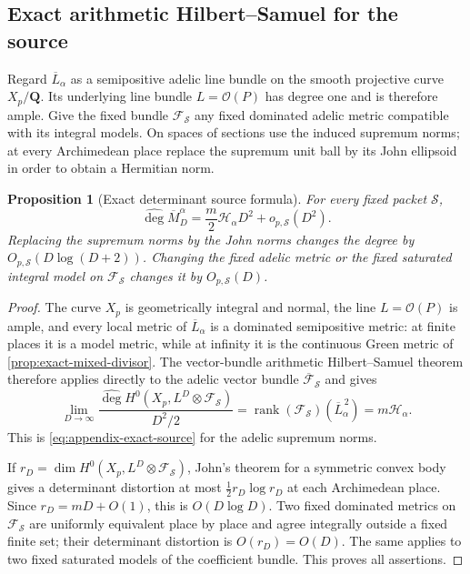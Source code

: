 \documentclass[11pt]{article}
\newtheorem{proposition}[proposition]{Proposition}
\theoremstyle{definition}
\theoremstyle{remark}
\newcommand{\Q}{\mathbf Q}
\newcommand{\rank}{\operatorname{rank}}
\newcommand{\calF}{\mathcal F}
\newcommand{\widehatdeg}{\widehat{\deg}}
\newcommand{\Energy}{\mathscr H}
\begin{document}
\subsection{Exact arithmetic Hilbert--Samuel for the source}

Regard $\overline L_\alpha$ as a semipositive adelic line bundle on the
smooth projective curve $X_p/\Q$.  Its underlying line bundle
$L=\mathcal O(P)$ has degree one and is therefore ample.  Give the fixed
bundle $\calF_{\mathcal S}$ any fixed dominated adelic metric compatible with
its integral models.  On spaces of sections use the induced supremum norms;
at every Archimedean place replace the supremum unit ball by its John
ellipsoid in order to obtain a Hermitian norm.

\begin{proposition}[Exact determinant source formula]
\label{prop:exact-source-formula}
For every fixed packet $\mathcal S$,
\begin{equation}\label{eq:appendix-exact-source}
 \widehatdeg\overline M_D^\alpha
 =\frac m2\Energy_\alpha D^2+o_{p,\mathcal S}(D^2).
\end{equation}
Replacing the supremum norms by the John norms changes the degree by
$O_{p,\mathcal S}(D\log(D+2))$.  Changing the fixed adelic metric or the fixed
saturated integral model on $\calF_{\mathcal S}$ changes it by
$O_{p,\mathcal S}(D)$.
\end{proposition}

\begin{proof}
The curve $X_p$ is geometrically integral and normal, the line
$L=\mathcal O(P)$ is ample, and every local metric of
$\overline L_\alpha$ is a dominated semipositive metric: at finite places
it is a model metric, while at infinity it is the continuous Green metric of
\cref{prop:exact-mixed-divisor}.  The vector-bundle arithmetic
Hilbert--Samuel theorem
\cite[Corollary~4.5.2]{ChenMoriwaki2024} therefore applies directly to the
adelic vector bundle $\overline{\calF}_{\mathcal S}$ and gives
\[
 \lim_{D\to\infty}
 \frac{\widehatdeg H^0(X_p,L^D\otimes\calF_{\mathcal S})}{D^2/2}
 =\rank(\calF_{\mathcal S})
   (\overline L_\alpha^{\,2})
 =m\Energy_\alpha.
\]
This is \eqref{eq:appendix-exact-source} for the adelic supremum norms.

If $r_D=\dim H^0(X_p,L^D\otimes\calF_{\mathcal S})$, John's theorem for a
symmetric convex body gives a determinant distortion at most
$\tfrac12r_D\log r_D$ at each Archimedean place.  Since $r_D=mD+O(1)$, this
is $O(D\log D)$.  Two fixed dominated metrics on
$\calF_{\mathcal S}$ are uniformly equivalent place by place and agree
integrally outside a fixed finite set; their determinant distortion is
$O(r_D)=O(D)$.  The same applies to two fixed saturated models of the
coefficient bundle.  This proves all assertions.
\end{proof}
\end{document}
